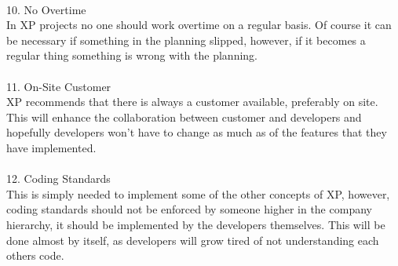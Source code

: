 \\
10. No Overtime\\
In XP projects no one should work overtime on a regular basis. Of course it can be necessary if something in the planning slipped, however, if it becomes a regular thing something is wrong with the planning.\\
\\
11. On-Site Customer\\
XP recommends that there is always a customer available, preferably on site. This will enhance the collaboration between customer and developers and hopefully developers won't have to change as much as of the features that they have implemented.\\
\\
12. Coding Standards\\
This is simply needed to implement some of the other concepts of XP, however, coding standards should not be enforced by someone higher in the company hierarchy, it should be implemented by the developers themselves. This will be done almost by itself, as developers will grow tired of not understanding each others code. \\
